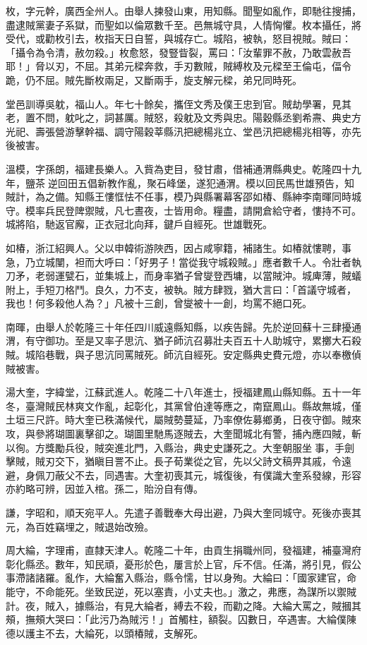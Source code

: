 \begin{pinyinscope}
枚，字元幹，廣西全州人。由舉人揀發山東，用知縣。聞聖如亂作，即馳往搜捕，盡逮賊黨妻子系獄，而聖如以倫眾數千至。邑無城守具，人情恟懼。枚本攝任，將受代，或勸枚引去，枚指天日自誓，與城存亡。城陷，被執，怒目視賊。賊曰：「攝令為令清，赦勿殺。」枚愈怒，發豎眥裂，罵曰：「汝輩罪不赦，乃敢雲赦吾耶！」脅以刃，不屈。其弟元樑奔救，手刃數賊，賊縛枚及元樑至王倫屯，偪令跪，仍不屈。賊先斷枚兩足，又斷兩手，旋支解元樑，弟兄同時死。

堂邑訓導吳躭，福山人。年七十餘矣，攜侄文秀及僕王忠到官。賊劫學署，見其老，置不問，躭叱之，詞甚厲。賊怒，殺躭及文秀與忠。陽穀縣丞劉希燾、典史方光祀、壽張營游擊幹福、調守陽穀莘縣汛把總楊兆立、堂邑汛把總楊兆相等，亦先後被害。

溫模，字孫朗，福建長樂人。入貲為吏目，發甘肅，借補通渭縣典史。乾隆四十九年，鹽茶逆回田五倡新教作亂，聚石峰堡，遂犯通渭。模以回民馬世雄預告，知賊計，為之備。知縣王慺恇怯不任事，模乃與縣署幕客邵如椿、縣紳李南暉同時城守。模率兵民登陴禦賊，凡七晝夜，士皆用命。糧盡，請開倉給守者，慺持不可。城將陷，馳返官廨，正衣冠北向拜，鍵戶自經死。世雄戰死。

如椿，浙江紹興人。父以申韓術游陜西，因占咸寧籍，補諸生。如椿就慺聘，事急，乃立城闉，袒而大呼曰：「好男子！當從我守城殺賊。」應者數千人。令壯者執刀矛，老弱運甓石，並集城上，而身率猶子曾燮登西墉，以當賊沖。城庳薄，賊蟻附上，手短刀格鬥。良久，力不支，被執。賊方肆戮，猶大言曰：「首議守城者，我也！何多殺他人為？」凡被十三創，曾燮被十一創，均罵不絕口死。

南暉，由舉人於乾隆三十年任四川威遠縣知縣，以疾告歸。先於逆回蘇十三肆擾通渭，有守御功。至是又率子思沆、猶子師沆召募壯夫百五十人助城守，累擲大石殺賊。城陷巷戰，與子思沆同罵賊死。師沆自經死。安定縣典史費元燈，亦以奉檄偵賊被害。

湯大奎，字緯堂，江蘇武進人。乾隆二十八年進士，授福建鳳山縣知縣。五十一年冬，臺灣賊民林爽文作亂，起彰化，其黨曾伯達等應之，南竄鳳山。縣故無城，僅土垣三尺許。時大奎已秩滿候代，屬賊勢蔓延，乃率僚佐募鄉勇，日夜守御。賊來攻，與參將瑚圖裏擊卻之。瑚圖里馳馬逐賊去，大奎聞城北有警，捕內應四賊，斬以徇。方獎勵兵役，賊突進北門，入縣治，典史史謙死之。大奎朝服坐事，手劍擊賊，賊刃交下，猶瞋目詈不止。長子荀業從之官，先以父詩文稿畀其戚，令遠避，身佩刀蔽父不去，同遇害。大奎初喪其元，城復後，有僕識大奎系發線，形容亦約略可辨，因並入棺。孫二，貽汾自有傳。

謙，字昭和，順天宛平人。先遣子善戰奉大母出避，乃與大奎同城守。死後亦喪其元，為百姓竊埋之，賊退始改殮。

周大綸，字理甫，直隸天津人。乾隆二十年，由貢生捐職州同，發福建，補臺灣府彰化縣丞。數年，知民頑，憂形於色，屢言於上官，斥不信。任滿，將引見，假公事滯諸諸羅。亂作，大綸奮入縣治，縣令懦，甘以身殉。大綸曰：「國家建官，命能守，不命能死。坐致民逆，死以塞責，小丈夫也。」激之，弗應，為謀所以禦賊計。夜，賊入，據縣治，有見大綸者，縛去不殺，而勸之降。大綸大罵之，賊摑其頰，撫頰大哭曰：「此污乃為賊污！」首觸柱，額裂。囚數日，卒遇害。大綸僕陳德以護主不去，大綸死，以頭椿賊，支解死。


\end{pinyinscope}
